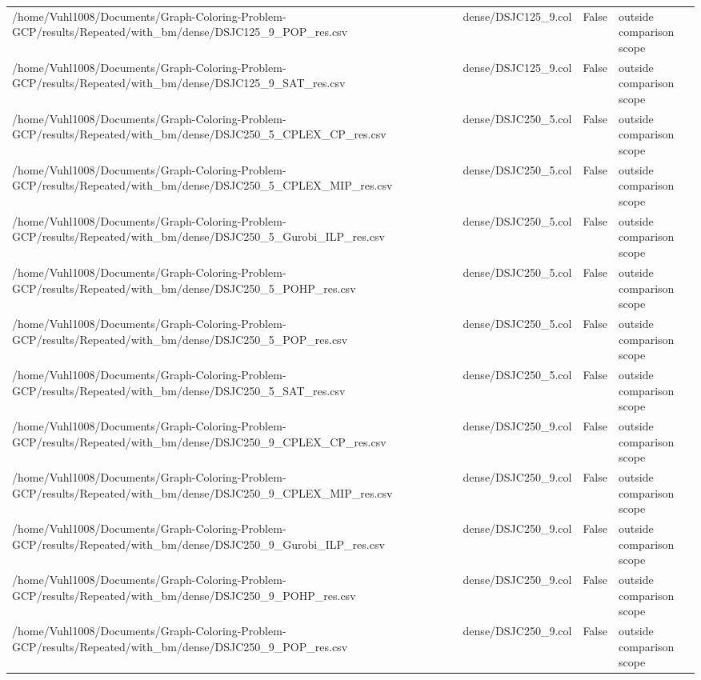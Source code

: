\begin{table}[htbp]
\begin{tabular}{llll}
/home/Vuhl1008/Documents/Graph-Coloring-Problem-GCP/results/Repeated/with\_bm/dense/DSJC125\_9\_POP\_res.csv & dense/DSJC125\_9.col & False & outside comparison scope \\
/home/Vuhl1008/Documents/Graph-Coloring-Problem-GCP/results/Repeated/with\_bm/dense/DSJC125\_9\_SAT\_res.csv & dense/DSJC125\_9.col & False & outside comparison scope \\
/home/Vuhl1008/Documents/Graph-Coloring-Problem-GCP/results/Repeated/with\_bm/dense/DSJC250\_5\_CPLEX\_CP\_res.csv & dense/DSJC250\_5.col & False & outside comparison scope \\
/home/Vuhl1008/Documents/Graph-Coloring-Problem-GCP/results/Repeated/with\_bm/dense/DSJC250\_5\_CPLEX\_MIP\_res.csv & dense/DSJC250\_5.col & False & outside comparison scope \\
/home/Vuhl1008/Documents/Graph-Coloring-Problem-GCP/results/Repeated/with\_bm/dense/DSJC250\_5\_Gurobi\_ILP\_res.csv & dense/DSJC250\_5.col & False & outside comparison scope \\
/home/Vuhl1008/Documents/Graph-Coloring-Problem-GCP/results/Repeated/with\_bm/dense/DSJC250\_5\_POHP\_res.csv & dense/DSJC250\_5.col & False & outside comparison scope \\
/home/Vuhl1008/Documents/Graph-Coloring-Problem-GCP/results/Repeated/with\_bm/dense/DSJC250\_5\_POP\_res.csv & dense/DSJC250\_5.col & False & outside comparison scope \\
/home/Vuhl1008/Documents/Graph-Coloring-Problem-GCP/results/Repeated/with\_bm/dense/DSJC250\_5\_SAT\_res.csv & dense/DSJC250\_5.col & False & outside comparison scope \\
/home/Vuhl1008/Documents/Graph-Coloring-Problem-GCP/results/Repeated/with\_bm/dense/DSJC250\_9\_CPLEX\_CP\_res.csv & dense/DSJC250\_9.col & False & outside comparison scope \\
/home/Vuhl1008/Documents/Graph-Coloring-Problem-GCP/results/Repeated/with\_bm/dense/DSJC250\_9\_CPLEX\_MIP\_res.csv & dense/DSJC250\_9.col & False & outside comparison scope \\
/home/Vuhl1008/Documents/Graph-Coloring-Problem-GCP/results/Repeated/with\_bm/dense/DSJC250\_9\_Gurobi\_ILP\_res.csv & dense/DSJC250\_9.col & False & outside comparison scope \\
/home/Vuhl1008/Documents/Graph-Coloring-Problem-GCP/results/Repeated/with\_bm/dense/DSJC250\_9\_POHP\_res.csv & dense/DSJC250\_9.col & False & outside comparison scope \\
/home/Vuhl1008/Documents/Graph-Coloring-Problem-GCP/results/Repeated/with\_bm/dense/DSJC250\_9\_POP\_res.csv & dense/DSJC250\_9.col & False & outside comparison scope \\

\end{tabular}
\end{table}
